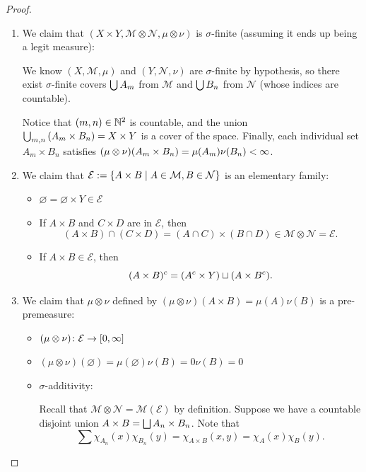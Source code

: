 \documentclass[11pt,leqno,oneside]{amsbook}
\numberwithin{thm}{section}
\newcommand{\M}{\mathcal{M}} %
\newcommand{\E}{\mathcal{E}}
\newcommand{\cN}{\mathcal{N}}
\newcommand{\s}{$\sigma$-} %
\newcommand{\x}{\times}
\newcommand{\ox}{\otimes}
\renewcommand{\emptyset}{\varnothing}
\begin{document}
\begin{proof}
  \mbox{}
  \begin{enumerate}[label=(\arabic{*})]
    \item We claim that $(X \x Y, \M \ox \cN, \mu \ox \nu)$ is \s finite (assuming it ends up being a legit measure):

    We know $(X, \M, \mu)$ and $(Y, \cN, \nu)$ are \s finite by hypothesis, so there exist \s finite covers $\bigcup A_m$ from $\M$ and $\bigcup B_n$ from $\cN$ (whose indices are countable).

    Notice that $(m, n) \in {\mathbb N}^2$ is countable, and the union $\Union_{m,n}\left(A_m \x B_n\right) = X \x Y$ is a cover of the space.  Finally, each individual set $A_m \x B_n$ satisfies $(\mu\ox\nu)(A_m \x B_n) = \mu(A_m)\nu(B_n) < \oo$.

    \item We claim that $\E := \{A \x B \st A \in \M, B \in \cN\}$ is an elementary family:

    \begin{itemize}
      \item $\emptyset = \emptyset \x Y \in \E$
      \item If $A \x B$ and $C \x D$ are in $\E$, then $$(A \x B) \cap (C \x D) = (A \cap C) \x (B \cap D) \in \M \ox \cN = \E.$$
      \item If $A \x B \in \E$, then $$(A \x B)^c = (A^c \x Y) \dunion (A \x B^c).$$
    \end{itemize}

    \item We claim that $\mu \ox \nu$ defined by $(\mu\ox\nu)(A \x B) = \mu(A)\nu(B)$ is a pre-premeasure:

    \begin{itemize}
      \item $(\mu\ox\nu)\from\E\to[0, \oo]$
      \item $(\mu\ox\nu)(\emptyset) = \mu(\emptyset)\nu(B) = 0\nu(B) = 0$
      \item \s additivity:

      Recall that $\M \ox \cN = \M(\E)$ by definition.  Suppose we have a countable disjoint union $A \x B = \Dunion A_n \x B_n$.  Note that
      $$\sum \chi_{A_n}(x)\chi_{B_n}(y) = \chi_{A \x B}(x,y) = \chi_A(x)\chi_B(y).$$


\end{itemize}
\end{enumerate}
\end{proof}
\end{document}
